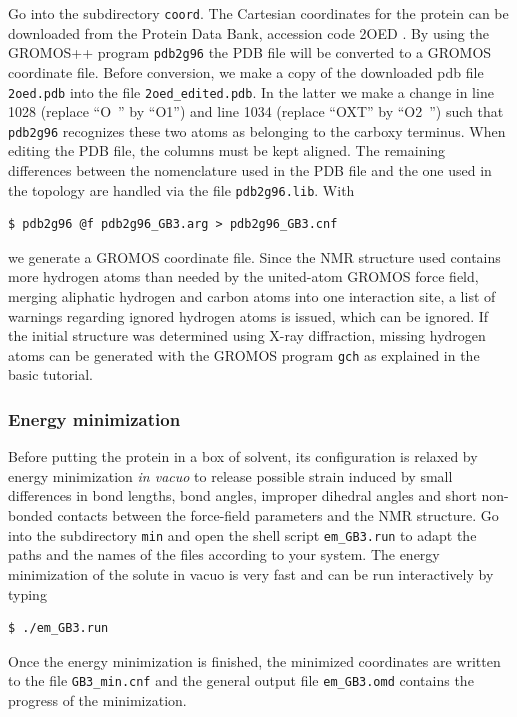 Go into the subdirectory \texttt{coord}. The Cartesian coordinates for the protein can be downloaded from the Protein Data Bank, accession code 2OED \cite{Ulmer_2003}. By using the GROMOS++ program \texttt{pdb2g96} the PDB file will be converted to a GROMOS coordinate file. Before conversion, we make a copy of the downloaded pdb file \texttt{2oed.pdb} into the file \texttt{2oed\_edited.pdb}. In the latter we make a change in line 1028 (replace “O~” by “O1”) and line 1034 (replace “OXT” by “O2~”) such that \texttt{pdb2g96} recognizes these two atoms as belonging to the carboxy terminus. When editing the PDB file, the columns must be kept aligned. The remaining differences between the nomenclature used in the PDB file and the one used in the topology are handled via the file \texttt{pdb2g96.lib}. With
\begin{lstlisting}
$ pdb2g96 @f pdb2g96_GB3.arg > pdb2g96_GB3.cnf
\end{lstlisting}
we generate a GROMOS coordinate file. 
Since the NMR structure used contains more hydrogen atoms than needed by the united-atom GROMOS force field, merging aliphatic hydrogen and carbon atoms into one interaction site, 
a list of warnings regarding ignored hydrogen atoms is issued, which can be ignored. If the initial structure was determined using X-ray diffraction, missing hydrogen atoms can be generated 
with the GROMOS program \texttt{gch} as explained in the basic tutorial.

\subsubsection{Energy minimization}

Before putting the protein in a box of solvent, its configuration is relaxed by energy minimization 
\textit{in vacuo} to release possible strain induced by small differences in bond lengths, bond angles, improper dihedral angles and short non-bonded contacts 
between the force-field parameters and the NMR structure.
Go into the subdirectory \texttt{min} and open the shell script \texttt{em\_GB3.run} to adapt the paths and the names of the files according to your system. 
The energy minimization of the solute in vacuo is very fast and can be run interactively by typing
\begin{lstlisting}
$ ./em_GB3.run
\end{lstlisting}
Once the energy minimization is finished, the minimized coordinates are written to the file \texttt{GB3\_min.cnf} and the general output file \texttt{em\_GB3.omd} contains the progress of the minimization.

